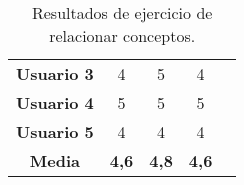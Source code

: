 \begin{table}[H]
{\begin{tabular}{c|ccc|l}
            \multicolumn{1}{|c|}{\textbf{Usuario 3}} & \multicolumn{1}{c|}{4}                                                                                                                                          & \multicolumn{1}{c|}{5}                                                                                                                                                                 & 4                                                                                                                                                                                                        & \\ \cline{1-4}
            \multicolumn{1}{|c|}{\textbf{Usuario 4}} & \multicolumn{1}{c|}{5}                                                                                                                                          & \multicolumn{1}{c|}{5}                                                                                                                                                                 & 5                                                                                                                                                                                                        & \\ \cline{1-4}
            \multicolumn{1}{|c|}{\textbf{Usuario 5}} & \multicolumn{1}{c|}{4}                                                                                                                                          & \multicolumn{1}{c|}{4}                                                                                                                                                                 & 4                                                                                                                                                                                                        & \\ \cline{1-4}
            \multicolumn{1}{|c|}{\textbf{Media}}     & \multicolumn{1}{c|}{\textbf{4,6}}                                                                                                                               & \multicolumn{1}{c|}{\textbf{4,8}}                                                                                                                                                      & \textbf{4,6}                                                                                                                                                                                             & \\ \cline{1-4}
        \end{tabular}
    }
    \caption{Resultados de ejercicio de relacionar conceptos.}
    \label{tab:resultadosRelacionarConceptos}
\end{table}

